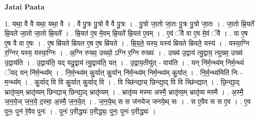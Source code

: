 \documentclass[17pt]{extarticle}
\begin{document}
\textbf{Jatai Paata} \newline

1. यथा॒ वै वै यथा॒ यथा॒ वै । . वै पु॒त्रः पु॒त्रो वै वै पु॒त्रः । . पु॒त्रो जा॒तो जा॒तः पु॒त्रः पु॒त्रो जा॒तः । . जा॒तो म्रि॒यते᳚ म्रि॒यते॑ जा॒तो जा॒तो म्रि॒यते᳚ । . म्रि॒यत॑ ए॒व मे॒वम् म्रि॒यते᳚ म्रि॒यत॑ ए॒वम् । . ए॒वं ॅवै वा ए॒व मे॒वं ॅवै । . वा ए॒ष ए॒ष वै वा ए॒षः । . ए॒ष म्रि॑यते म्रियत ए॒ष ए॒ष म्रि॑यते । . म्रि॒य॒ते॒ यस्य॒ यस्य॑ म्रियते म्रियते॒ यस्य॑ । . यस्या॒ग्नि र॒ग्निर् यस्य॒ यस्या॒ग्निः । . अ॒ग्नि रुख्य॒ उख्यो॒ ऽग्नि र॒ग्नि रुख्यः॑ । . उख्य॑ उ॒द्वाय॑ त्यु॒द्वाय॒ त्युख्य॒ उख्य॑ उ॒द्वाय॑ति । . उ॒द्वाय॑ति॒ यद् यदु॒द्वाय॑ त्यु॒द्वाय॑ति॒ यत् । . उ॒द्वाय॒तीयु॑त् - वाय॑ति । . यन् नि॑र्म॒न्थ्य॑म् निर्म॒न्थ्यं॑ ॅयद् यन् नि॑र्म॒न्थ्य᳚म् । . नि॒र्म॒न्थ्य॑म् कु॒र्यात् कु॒र्यान् नि॑र्म॒न्थ्य॑म् निर्म॒न्थ्य॑म् कु॒र्यात् । . नि॒र्म॒न्थ्य॑मिति॑ निः - म॒न्थ्य᳚म् । . कु॒र्याद् वि वि कु॒र्यात् कु॒र्याद् वि । . वि च्छि॑न्द्याच् छिन्द्या॒द् वि वि च्छि॑न्द्यात् । . छि॒न्द्या॒द् भ्रातृ॑व्य॒म् भ्रातृ॑व्यम् छिन्द्याच् छिन्द्या॒द् भ्रातृ॑व्यम् । . भ्रातृ॑व्य मस्मा अस्मै॒ भ्रातृ॑व्य॒म् भ्रातृ॑व्य मस्मै । . अ॒स्मै॒ ज॒न॒ये॒ज् ज॒न॒ये॒ द॒स्मा॒ अ॒स्मै॒ ज॒न॒ये॒त् । . ज॒न॒ये॒थ् स स ज॑नयेज् जनये॒थ् सः । . स ए॒वैव स स ए॒व । . ए॒व पुनः॒ पुन॑ रे॒वैव पुनः॑ । . पुनः॑ प॒रीद्ध्यः॑ प॒रीद्ध्यः॒ पुनः॒ पुनः॑ प॒रीद्ध्यः॑ । \newline
\end{document}
